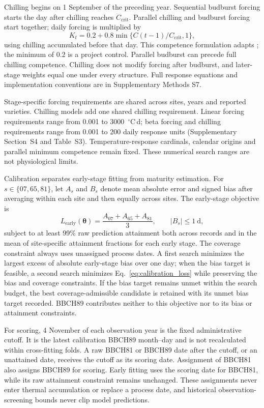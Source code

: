 \documentclass[a4paper,12pt]{article}
\begin{document}
Chilling begins on 1 September of the preceding year. Sequential budburst
forcing starts the day after chilling reaches $C_{\mathrm{crit}}$. Parallel
chilling and budburst forcing start together; daily forcing is multiplied by
\begin{equation}
K_t=0.2+0.8\min\{C(t-1)/C_{\mathrm{crit}},1\},
\label{eq:parallel_competence}
\end{equation}
using chilling accumulated before that day. This competence formulation adapts
\citet{liuSimulatingOnsetSpring2018}; the minimum of 0.2 is a project control.
Parallel budburst can precede full chilling competence. Chilling does not
modify forcing after budburst, and later-stage weights equal one under every
structure. Full response equations and implementation conventions are in
Supplementary Methods S7.

Stage-specific forcing requirements are shared across sites, years and reported varieties. Chilling models add one shared chilling requirement. Linear forcing requirements range from 0.001 to 3000~$^{\circ}$C\,d; beta forcing and chilling requirements range from 0.001 to 200 daily response units (Supplementary Section~S4 and Table~S3). Temperature-response cardinals, calendar origins and parallel minimum competence remain fixed. These numerical search ranges are not physiological limits.

Calibration separates early-stage fitting from maturity estimation. For $s\in\{07,65,81\}$, let $A_s$ and $B_s$ denote mean absolute error and signed bias after averaging within each site and then equally across sites. The early-stage objective is
\begin{equation}
L_{\mathrm{early}}(\symbf\theta)=\frac{A_{07}+A_{65}+A_{81}}{3},
\qquad |B_s|\leq1\ \mathrm{d},
\label{eq:calibration_loss}
\end{equation}
subject to at least 99\% raw prediction attainment both across records and in the mean of site-specific attainment fractions for each early stage. The coverage constraint always uses unassigned process dates. A first search minimizes the largest excess of absolute early-stage bias over one day; when the bias target is feasible, a second search minimizes Eq.~\ref{eq:calibration_loss} while preserving the bias and coverage constraints. If the bias target remains unmet within the search budget, the best coverage-admissible candidate is retained with its unmet bias target recorded. BBCH89 contributes neither to this objective nor to its bias or attainment constraints.

For scoring, 4 November of each observation year is the fixed administrative cutoff. It is the latest calibration BBCH89 month--day and is not recalculated within cross-fitting folds. A raw BBCH81 or BBCH89 date after the cutoff, or an unattained date, receives the cutoff as its scoring date. Assignment of BBCH81 also assigns BBCH89 for scoring. Early fitting uses the scoring date for BBCH81, while its raw attainment constraint remains unchanged. These assignments never enter thermal accumulation or replace a process date, and historical observation-screening bounds never clip model predictions.
\end{document}
